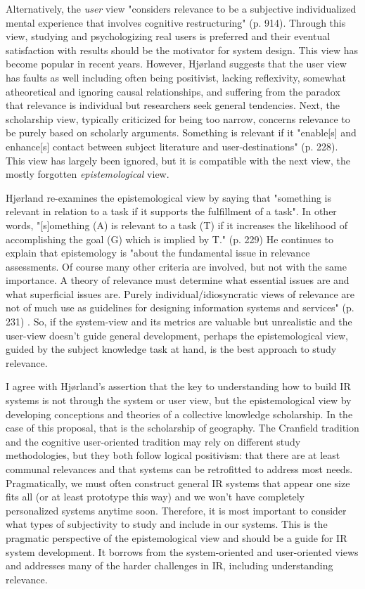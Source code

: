 Alternatively, the \emph{user} view "considers relevance to be a subjective individualized mental experience that involves cognitive restructuring" \cite{Borlund2003}(p. 914). Through this view, studying and psychologizing real users is preferred and their eventual satisfaction with results should be the motivator for system design. This view has become popular in recent years. However, Hjørland suggests that the user view has faults as well including often being positivist, lacking reflexivity, somewhat atheoretical and ignoring causal relationships, and suffering from the paradox that relevance is individual but researchers seek general tendencies. Next, the scholarship view, typically criticized for being too narrow, concerns relevance to be purely based on scholarly arguments. Something is relevant if it "enable[s] and enhance[s] contact between subject literature and user-destinations" \cite{Hjorland2010}(p. 228). This view has largely been ignored, but it is compatible with the next view, the mostly forgotten \emph{epistemological} view.

Hjørland re-examines the epistemological view by saying that "something is relevant in relation to a task if it supports the fulfillment of a task". In other words, "[s]omething (A) is relevant to a task (T) if it increases the likelihood of accomplishing the goal (G) which is implied by T." \cite{Hjorland2010}(p. 229) He continues to explain that epistemology is "about the fundamental issue in relevance assessments. Of course many other criteria are involved, but not with the same importance. A theory of relevance must determine what essential issues are and what superficial issues are. Purely individual/idiosyncratic views of relevance are not of much use as guidelines for designing information systems and services" \cite{Hjorland2010}(p. 231) \cite{Hjorland2002}. So, if the system-view and its metrics are valuable but unrealistic and the user-view doesn't guide general development, perhaps the epistemological view, guided by the subject knowledge task at hand, is the best approach to study relevance.

I agree with Hjørland's assertion that the key to understanding how to build IR systems is not through the system or user view, but the epistemological view by developing conceptions and theories of a collective knowledge scholarship. In the case of this proposal, that is the scholarship of geography. The Cranfield tradition and the cognitive user-oriented tradition may rely on different study methodologies, but they both follow logical positivism: that there are at least communal relevances and that systems can be retrofitted to address most needs. Pragmatically, we must often construct general IR systems that appear one size fits all (or at least prototype this way) and we won't have completely personalized systems anytime soon. Therefore, it is most important to consider what types of subjectivity to study and include in our systems. This is the pragmatic perspective of the epistemological view and should be a guide for IR system development. It borrows from the system-oriented and user-oriented views and addresses many of the harder challenges in IR, including understanding relevance.